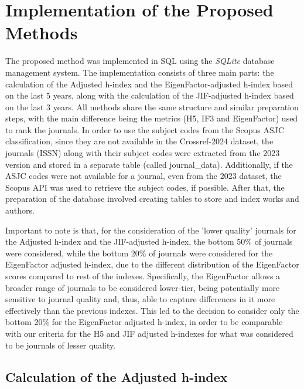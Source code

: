 \section{Implementation of the Proposed Methods}

The proposed method was implemented in SQL using the \emph{SQLite} database
management system. The implementation consists of three main parts: the
calculation of the Adjusted h-index and the EigenFactor-adjusted h-index based
on the last 5 years, along with the calculation of the JIF-adjusted h-index
based on the last 3 years. All methods share the same structure and similar
preparation steps, with the main difference being the metrics (H5, IF3 and
EigenFactor) used to rank the journals. In order to use the subject codes from
the Scopus ASJC classification, since they are not available in the
Crossref-2024 dataset, the journals (ISSN) along with their subject codes were
extracted from the 2023 version and stored in a separate table (called
journal\_data). Additionally, if the ASJC codes were not available for a
journal, even from the 2023 dataset, the Scopus API was used to retrieve the
subject codes, if possible. After that, the preparation of the database
involved creating tables to store and index works and authors.

Important to note is that, for the consideration of the 'lower quality'
journals for the Adjusted h-index and the JIF-adjusted h-index, the bottom 50\%
of journals were considered, while the bottom 20\% of journals were considered
for the EigenFactor adjusted h-index, due to the different distribution of the
EigenFactor scores compared to rest of the indexes. Specifically, the
EigenFactor allows a broader range of journals to be considered lower-tier,
being potentially more sensitive to journal quality and, thus, able to capture
differences in it more effectively than the previous indexes. This led to the
decision to consider only the bottom 20\% for the EigenFactor adjusted h-index,
in order to be comparable with our criteria for the H5 and JIF adjusted
h-indexes for what was considered to be journals of lesser quality.

\subsection{Calculation of the Adjusted h-index}

